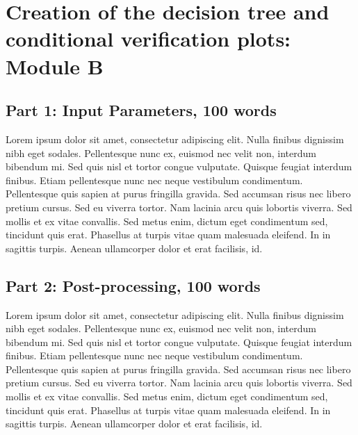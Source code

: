 \documentclass[techmemo]{ecmwfrep}%
\begin{document}
\section{Creation of the decision tree and conditional verification plots: Module B}

\subsection{Part 1: Input Parameters, 100 words}
Lorem ipsum dolor sit amet, consectetur adipiscing elit. Nulla finibus dignissim nibh eget sodales. Pellentesque nunc ex, euismod nec velit non, interdum bibendum mi. Sed quis nisl et tortor congue vulputate. Quisque feugiat interdum finibus. Etiam pellentesque nunc nec neque vestibulum condimentum. Pellentesque quis sapien at purus fringilla gravida. Sed accumsan risus nec libero pretium cursus. Sed eu viverra tortor. Nam lacinia arcu quis lobortis viverra. Sed mollis et ex vitae convallis. Sed metus enim, dictum eget condimentum sed, tincidunt quis erat. Phasellus at turpis vitae quam malesuada eleifend. In in sagittis turpis. Aenean ullamcorper dolor et erat facilisis, id.

\subsection{Part 2: Post-processing, 100 words}
Lorem ipsum dolor sit amet, consectetur adipiscing elit. Nulla finibus dignissim nibh eget sodales. Pellentesque nunc ex, euismod nec velit non, interdum bibendum mi. Sed quis nisl et tortor congue vulputate. Quisque feugiat interdum finibus. Etiam pellentesque nunc nec neque vestibulum condimentum. Pellentesque quis sapien at purus fringilla gravida. Sed accumsan risus nec libero pretium cursus. Sed eu viverra tortor. Nam lacinia arcu quis lobortis viverra. Sed mollis et ex vitae convallis. Sed metus enim, dictum eget condimentum sed, tincidunt quis erat. Phasellus at turpis vitae quam malesuada eleifend. In in sagittis turpis. Aenean ullamcorper dolor et erat facilisis, id.

\end{document}
